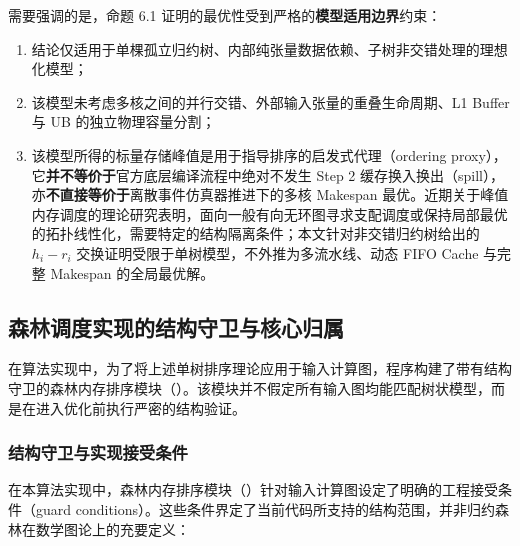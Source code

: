 \documentclass[anonymous,withtoc]{gmcm2026}
\providecommand{\tightlist}{\setlength{\itemsep}{0pt}\setlength{\parskip}{0pt}}
\begin{document}
需要强调的是，命题 6.1 证明的最优性受到严格的\textbf{模型适用边界}约束：

\begin{enumerate}
\def\labelenumi{\arabic{enumi}.}
\tightlist
\item
  结论仅适用于单棵孤立归约树、内部纯张量数据依赖、子树非交错处理的理想化模型；
\item
  该模型未考虑多核之间的并行交错、外部输入张量的重叠生命周期、L1 Buffer 与 UB 的独立物理容量分割；
\item
  该模型所得的标量存储峰值是用于指导排序的启发式代理（ordering proxy），它\textbf{并不等价于}官方底层编译流程中绝对不发生 Step 2 缓存换入换出（spill），亦\textbf{不直接等价于}离散事件仿真器推进下的多核 Makespan 最优。近期关于峰值内存调度的理论研究表明，面向一般有向无环图寻求支配调度或保持局部最优的拓扑线性化，需要特定的结构隔离条件\cite{ref10}；本文针对非交错归约树给出的 \(h_i - r_i\) 交换证明受限于单树模型，不外推为多流水线、动态 FIFO Cache 与完整 Makespan 的全局最优解。
\end{enumerate}

\subsection{森林调度实现的结构守卫与核心归属}

在算法实现中，为了将上述单树排序理论应用于输入计算图，程序构建了带有结构守卫的森林内存排序模块（\texttt{}）。该模块并不假定所有输入图均能匹配树状模型，而是在进入优化前执行严密的结构验证。

\subsubsection{结构守卫与实现接受条件}

在本算法实现中，森林内存排序模块（\texttt{}）针对输入计算图设定了明确的工程接受条件（guard conditions）。这些条件界定了当前代码所支持的结构范围，并非归约森林在数学图论上的充要定义：
\end{document}
